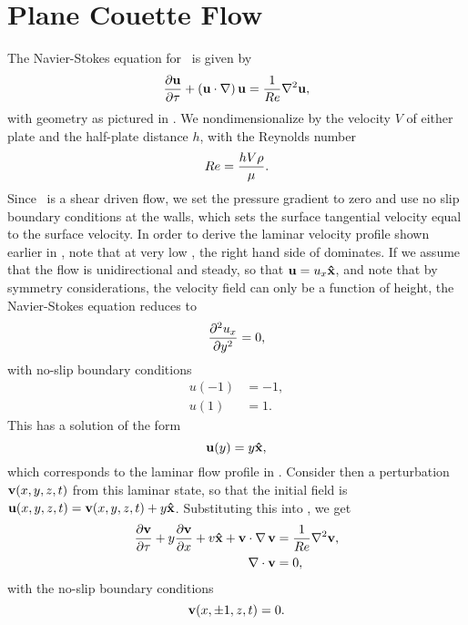 \section{Plane Couette Flow}
The Navier-Stokes equation for \pCf\ is given by 
\begin{equation}\label{eq:NSPCF}
\pder{1}{\Vector{u}}{\tau} + \paren{\Vector{u}\cdot\nabla}\Vector{u} = \frac{1}{\ReN}\nabla^2\Vector{u},
\end{equation}
with geometry as pictured in . We nondimensionalize by the velocity $V$ of either plate and the half-plate distance $h$, with the Reynolds number
\begin{equation}
Re = \dfrac{hV\rho}{\mu}.
\end{equation} Since \pCf\ is a shear driven flow, we set the pressure gradient to zero and use no slip boundary conditions at the walls, which sets the surface tangential velocity equal to the surface velocity. In order to derive the laminar velocity profile shown earlier in , note that at very low \ReN, the right hand side of  dominates. If we assume that the flow is unidirectional and steady, so that $\mathbf{u} = u_x \mathbf{\hat{x}}$, and note that by symmetry considerations, the velocity field can only be a function of height, the Navier-Stokes equation reduces to 
\begin{equation}
\pder{2}{u_x}{y} = 0,
\end{equation}
with no-slip boundary conditions 
\begin{align}
u(-1) &= -1,\\
u(1) &= 1.
\end{align}
This has a solution of the form
\begin{equation}
\mathbf{u}(y) = y\mathbf{\hat{x}},
\end{equation}
which corresponds to the laminar flow profile in . Consider then a perturbation $\mathbf{v}(x,y,z,t)$ from this laminar state, so that the initial field is $\mathbf{u}(x,y,z,t) = \mathbf{v} (x,y,z,t)+ y\mathbf{\hat{x}}$. Substituting this into , we get 
\begin{align}
\pder{1}{\Vector{v}}{\tau} + y\pder{1}{\Vector{v}}{x} + v\Vector{\hat{x}} + \Vector{v}\cdot\Grad{\Vector{v}} &= \frac{1}{\ReN} \nabla^2\Vector{v},\label{eq:PertND}\\
\Div{\Vector{v}} &= 0,
\end{align}
with the no-slip boundary conditions 
\begin{equation}
\mathbf{v}(x,\pm 1,z,t) = 0.
\end{equation}
